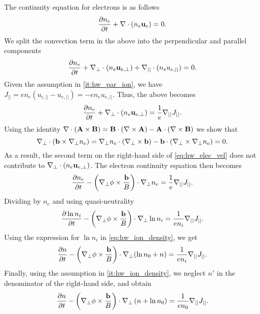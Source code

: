 \documentclass[11pt]{article}
\begin{document}
The continuity equation for electrons is as follows
\begin{equation}
    \frac{\partial n_e}{\partial t} + \nabla \cdot (n_e \mathbf{u}_e) = 0.
\end{equation}
We split the convection term in the above into the perpendicular and parallel components
\begin{equation}
    \frac{\partial n_e}{\partial t} + \nabla_\perp \cdot (n_e \mathbf{u}_{e,\perp}) + \nabla_{||} \cdot (n_e u_{e,||}) = 0.
\end{equation}
Given the assumption in \cref{it:hw_par_ion}, we have $J_{||} = e n_e (u_{i,||} - u_{e,||}) = -en_e u_{e,||}$. Thus, the above becomes
\begin{equation}
    \frac{\partial n_e}{\partial t} + \nabla_\perp \cdot (n_e \mathbf{u}_{e,\perp}) = \frac{1}{e} \nabla_{||} J_{||}.
\end{equation}
Using the identity $\nabla \cdot (\mathbf{A} \times \mathbf{B}) = \mathbf{B} \cdot (\nabla \times \mathbf{A}) - \mathbf{A} \cdot ( \nabla \times \mathbf{B})$ we show that 
\begin{equation}
    \nabla_\perp \cdot (\mathbf{b} \times \nabla_\perp n_e) = \nabla_\perp n_e \cdot (\nabla_\perp \times \mathbf{b}) - \mathbf{b} \cdot (\nabla_\perp \times \nabla_\perp n_e) = 0.
\end{equation}
As a result, the second term on the right-hand side of \cref{eq:hw_elec_vel} does not contribute to $\nabla_\perp \cdot (n_e \mathbf{u}_{e,\perp})$. The electron continuity equation then becomes
\begin{equation}
    \frac{\partial n_e}{\partial t} - \left ( \nabla_\perp \phi \times \frac{\mathbf{b}}{B} \right ) \cdot \nabla_\perp n_e = \frac{1}{e} \nabla_{||} J_{||}.
\end{equation}
Dividing by $n_e$ and using quasi-neutrality
\begin{equation}
    \frac{\partial \ln n_i}{\partial t} - \left ( \nabla_\perp \phi \times \frac{\mathbf{b}}{B} \right ) \cdot \nabla_\perp \ln n_i = \frac{1}{e n_i} \nabla_{||} J_{||}.
\end{equation}
Using the expression for $\ln n_i$ in \cref{eq:hw_ion_density}, we get
\begin{equation}
    \frac{\partial n}{\partial t} - \left ( \nabla_\perp \phi \times \frac{\mathbf{b}}{B} \right ) \cdot \nabla_\perp (\ln n_0 + n ) = \frac{1}{e n_i} \nabla_{||} J_{||}.
\end{equation}
Finally, using the assumption in \cref{it:hw_ion_density}, we neglect $n'$ in the denominator of the right-hand side, and obtain
\begin{equation}
    \label{eq:hw_electron_continuity}
    \frac{\partial n}{\partial t} - \left ( \nabla_\perp \phi \times \frac{\mathbf{b}}{B} \right ) \cdot \nabla_\perp \left ( n + \ln n_0 \right ) = \frac{1}{en_0} \nabla_{||} J_{||}.
\end{equation}
\end{document}
